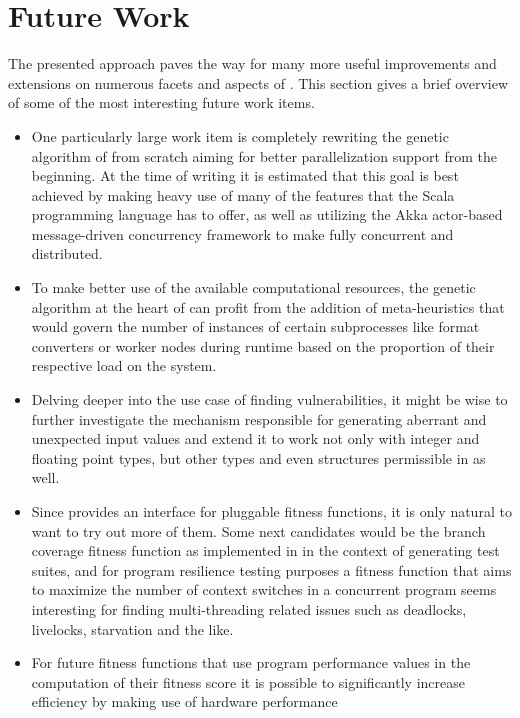 \section{Future Work}
\label{sec:future}
The presented approach paves the way for many more useful improvements and extensions on numerous facets and
aspects of \xmlmate. This section gives a brief overview of some of the most interesting future work items.
\begin{itemize}
\item[]One particularly large work item is completely rewriting the genetic algorithm of \xmlmate from scratch
aiming for better parallelization support from the beginning. At the time of writing it is estimated that this
goal is best achieved by making heavy use of many of the features that the {\small
Scala}\cite{scala-overview-tech-report} programming language has to offer, as well as utilizing the {\small
Akka} actor-based message-driven concurrency framework\cite{Wyatt:2013:AC:2663429} to make \xmlmate fully
concurrent and distributed.
\item[]To make better use of the available computational resources, the genetic algorithm at the heart of
\xmlmate can profit from the addition of meta-heuristics that would govern the number of instances of certain
subprocesses like format converters or worker nodes during runtime based on the proportion of their
respective load on the system.
\item[]Delving deeper into the use case of finding vulnerabilities, it might be wise to further investigate
the mechanism responsible for generating aberrant and unexpected input values and extend it to work not only
with integer and floating point types, but other types and even structures permissible in \xml as well.
\item[]Since \xmlmate provides an interface for pluggable fitness functions, it is only natural to want to try
out more of them. Some next candidates would be the branch coverage fitness function as implemented in
\evosuite in the context of generating test suites, and for program resilience testing purposes a fitness
function that aims to maximize the number of context switches in a concurrent program seems interesting for
finding multi-threading related issues such as deadlocks, livelocks, starvation and the like.
\item[]For future fitness functions that use program performance values in the computation of their
fitness score it is possible to significantly increase efficiency by making use of hardware performance

\end{itemize}
